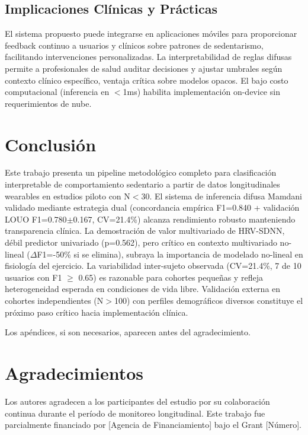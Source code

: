 \documentclass[journal,twoside,web]{ieeecolor}
\begin{document}
\subsection{Implicaciones Clínicas y Prácticas}
El sistema propuesto puede integrarse en aplicaciones móviles para proporcionar feedback continuo a usuarios y clínicos sobre patrones de sedentarismo, facilitando intervenciones personalizadas. La interpretabilidad de reglas difusas permite a profesionales de salud auditar decisiones y ajustar umbrales según contexto clínico específico, ventaja crítica sobre modelos opacos. El bajo costo computacional (inferencia en $<$1ms) habilita implementación on-device sin requerimientos de nube.

\section{Conclusión}
Este trabajo presenta un pipeline metodológico completo para clasificación interpretable de comportamiento sedentario a partir de datos longitudinales wearables en estudios piloto con N$<$30. El sistema de inferencia difusa Mamdani validado mediante estrategia dual (concordancia empírica F1=0.840 + validación LOUO F1=0.780$\pm$0.167, CV=21.4\%) alcanza rendimiento robusto manteniendo transparencia clínica. La demostración de valor multivariado de HRV-SDNN, débil predictor univariado (p=0.562), pero crítico en contexto multivariado no-lineal ($\Delta$F1=-50\% si se elimina), subraya la importancia de modelado no-lineal en fisiología del ejercicio. La variabilidad inter-sujeto observada (CV=21.4\%, 7 de 10 usuarios con F1 $\geq$ 0.65) es razonable para cohortes pequeñas y refleja heterogeneidad esperada en condiciones de vida libre. Validación externa en cohortes independientes (N$>$100) con perfiles demográficos diversos constituye el próximo paso crítico hacia implementación clínica.

\appendices

Los apéndices, si son necesarios, aparecen antes del agradecimiento.

\section*{Agradecimientos}

Los autores agradecen a los participantes del estudio por su colaboración continua durante el período de monitoreo longitudinal. Este trabajo fue parcialmente financiado por [Agencia de Financiamiento] bajo el Grant [Número].
\end{document}

